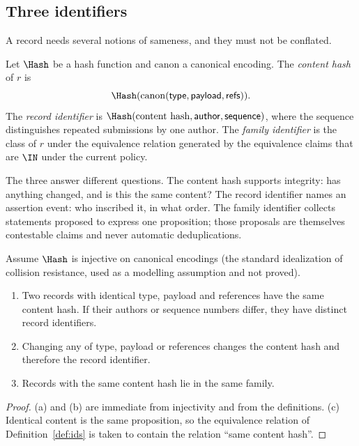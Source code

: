 \subsection{Three identifiers}

A record needs several notions of sameness, and they must not be conflated.

\begin{definition}[Identifiers]\label{def:ids}
Let $\Hash$ be a hash function and $\mathrm{canon}$ a canonical encoding. The \emph{content hash} of $r$ is
\[
\Hash(\mathrm{canon}(\mathsf{type},\mathsf{payload},\mathsf{refs})).
\]
The \emph{record identifier} is $\Hash(\text{content hash},\mathsf{author},\mathsf{sequence})$, where the sequence distinguishes repeated submissions by one author. The \emph{family identifier} is the class of $r$ under the equivalence relation generated by the equivalence claims that are $\IN$ under the current policy.
\end{definition}

The three answer different questions. The content hash supports integrity: has anything changed, and is this the same content? The record identifier names an assertion event: who inscribed it, in what order. The family identifier collects statements proposed to express one proposition; those proposals are themselves contestable claims and never automatic deduplications.

\begin{proposition}[Identity]\label{prop:identity}
Assume $\Hash$ is injective on canonical encodings (the standard idealization of collision resistance, used as a modelling assumption and not proved).
\begin{enumerate}[label=(\alph*)]
\item Two records with identical type, payload and references have the same content hash. If their authors or sequence numbers differ, they have distinct record identifiers.
\item Changing any of type, payload or references changes the content hash and therefore the record identifier.
\item Records with the same content hash lie in the same family.
\end{enumerate}
\end{proposition}

\begin{proof}
(a) and (b) are immediate from injectivity and from the definitions. (c) Identical content is the same proposition, so the equivalence relation of Definition~\ref{def:ids} is taken to contain the relation ``same content hash''.
\end{proof}

